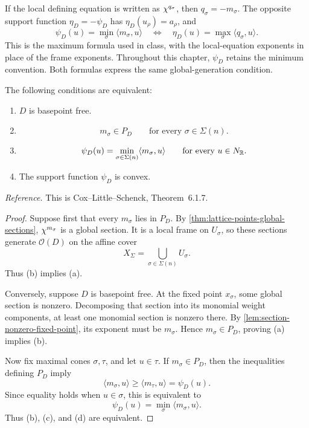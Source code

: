 \begin{observation}
\label{obs:classroom-support-sign}
If the local defining equation is written as
\(\chi^{q_\sigma}\), then \(q_\sigma=-m_\sigma\).
The opposite support function \(\eta_D=-\psi_D\) has
\(\eta_D(u_\rho)=a_\rho\), and
\[
\psi_D(u)=\min_\sigma\langle m_\sigma,u\rangle
\quad\Longleftrightarrow\quad
\eta_D(u)=\max_\sigma\langle q_\sigma,u\rangle.
\]
This is the maximum formula used in class, with the local-equation
exponents in place of the frame exponents. Throughout this chapter,
\(\psi_D\) retains the minimum convention. Both formulas express the
same global-generation condition.
\end{observation}

\begin{theorem}
\label{thm:basepoint-free-convex}
The following conditions are equivalent:

\begin{enumerate}[label=(\alph*),wide=0pt]
\item \(D\) is basepoint free.

\item
\[
m_\sigma\in P_D
\qquad
\text{for every }\sigma\in\Sigma(n).
\]

\item
\[
\psi_D(u)
=
\min_{\sigma\in\Sigma(n)}
\langle m_\sigma,u\rangle
\qquad
\text{for every }u\in N_{\mathbb{R}}.
\]

\item The support function \(\psi_D\) is convex.
\end{enumerate}
\end{theorem}

\noindent
\textit{Reference.}
This is Cox--Little--Schenck, Theorem~6.1.7.

\begin{proof}
Suppose first that every \(m_\sigma\) lies in \(P_D\). By
\cref{thm:lattice-points-global-sections},
\(\chi^{m_\sigma}\) is a global section. It is a local frame on
\(U_\sigma\), so these sections generate \(\mathcal O(D)\) on the
affine cover
\[
X_\Sigma=\bigcup_{\sigma\in\Sigma(n)}U_\sigma.
\]
Thus \textup{(b)} implies \textup{(a)}.

Conversely, suppose \(D\) is basepoint free. At the fixed point
\(x_\sigma\), some global section is nonzero. Decomposing that section
into its monomial weight components, at least one monomial section is
nonzero there. By \cref{lem:section-nonzero-fixed-point}, its exponent
must be \(m_\sigma\). Hence \(m_\sigma\in P_D\), proving
\textup{(a)} implies \textup{(b)}.

Now fix maximal cones \(\sigma,\tau\), and let \(u\in\tau\). If
\(m_\sigma\in P_D\), then the inequalities defining \(P_D\) imply
\[
\langle m_\sigma,u\rangle
\geq
\langle m_\tau,u\rangle
=
\psi_D(u).
\]
Since equality holds when \(u\in\sigma\), this is equivalent to
\[
\psi_D(u)=\min_\sigma\langle m_\sigma,u\rangle.
\]
Thus \textup{(b)}, \textup{(c)}, and \textup{(d)} are equivalent.
\end{proof}

